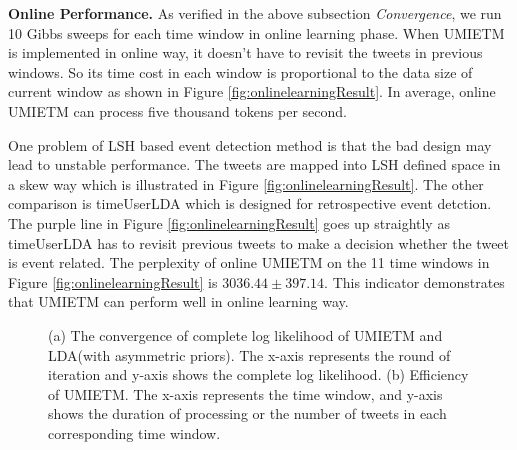 \documentclass[runningheads,a4paper]{llncs}
\begin{document}
\textbf{Online Performance.}
As verified in the above subsection \textit{Convergence}, we run 10 Gibbs sweeps for each time window in online learning phase.
When UMIETM is implemented in online way, it doesn't have to revisit the tweets in previous windows. 
So its time cost in each window is proportional to the data size of current window  as shown in Figure \ref{fig:onlinelearningResult}.
In average, online UMIETM can process five thousand tokens per second.

One problem of LSH based event detection method is that the bad design may lead to unstable performance. 
The tweets are mapped into LSH defined space in a skew way which is illustrated in Figure \ref{fig:onlinelearningResult}.
The other comparison is timeUserLDA\cite{timeUserLDA2012finding} which is designed for retrospective event detction. 
The purple line in Figure \ref{fig:onlinelearningResult} goes up straightly as timeUserLDA has to revisit previous tweets to make a decision whether the tweet is event related. 
The perplexity of online UMIETM on the 11 time windows in Figure \ref{fig:onlinelearningResult} is \(3036.44\pm397.14\). 
This indicator demonstrates that UMIETM can perform well in online learning way. 
\begin{figure}
        \centering
        \caption{(a) The convergence of complete log likelihood of UMIETM and LDA(with asymmetric priors). The x-axis represents the round of iteration and y-axis shows the complete log likelihood. (b) Efficiency of UMIETM. The x-axis represents the time window, and y-axis shows the duration of processing or the number of tweets in each corresponding time window.}
\end{figure}
\end{document}
